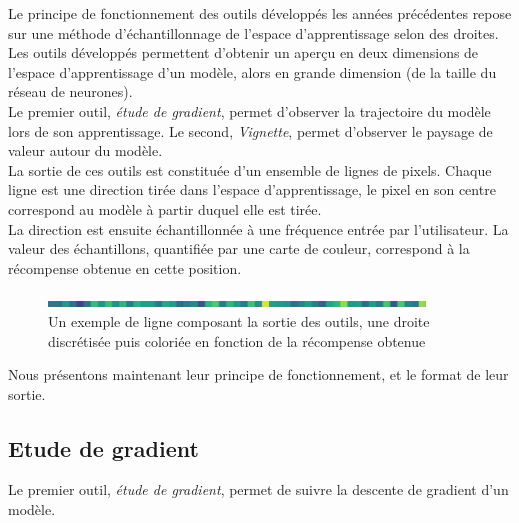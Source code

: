 \documentclass[12pt]{article}
\begin{document}
Le principe de fonctionnement des outils développés les années précédentes repose sur une méthode d’échantillonnage de l’espace d’apprentissage selon des droites. \\

Les outils développés permettent d'obtenir un aperçu en deux dimensions de l'espace d'apprentissage d'un modèle, alors en grande dimension (de la taille du réseau de neurones). \\

Le premier outil, \emph{étude de gradient}, permet d'observer la trajectoire du modèle lors de son apprentissage. Le second, \emph{Vignette}, permet d'observer le paysage de valeur autour du modèle. \\

La sortie de ces outils est constituée d’un ensemble de lignes de pixels. Chaque ligne est une direction tirée dans l’espace d’apprentissage, le pixel en son centre correspond au modèle à partir duquel elle est tirée. \\

La direction est ensuite échantillonnée à une fréquence entrée par l’utilisateur. La valeur des échantillons, quantifiée par une carte de couleur, correspond à la récompense obtenue en cette position. \\

\begin{figure}[htp]
    \centering
    \includegraphics[width=10cm]{Images/Ligne}
    \caption{Un exemple de ligne composant la sortie des outils, une droite discrétisée puis coloriée en fonction de la récompense obtenue}
    \label{fig:ligne1}
\end{figure}

Nous présentons maintenant leur principe de fonctionnement, et le format de leur sortie. \\

\subsection{Etude de gradient}

Le premier outil, \emph{étude de gradient}, permet de suivre la descente de gradient d’un modèle. \\
\end{document}
